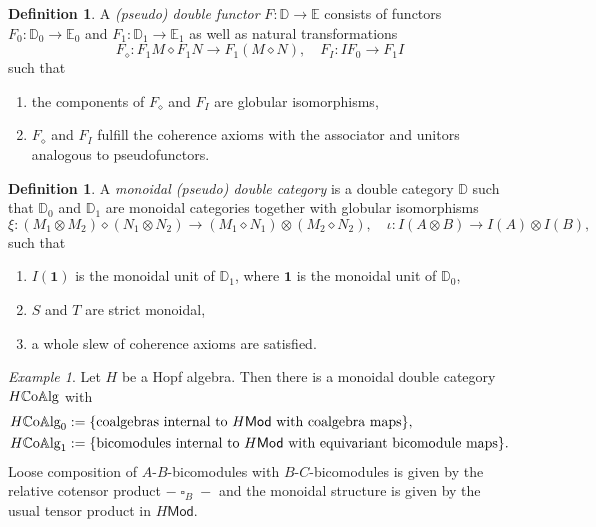 \documentclass[11pt]{report}
\theoremstyle{definition}
\newtheorem{definition}[theorem]{Definition}
\theoremstyle{remark}
\theoremstyle{remark}
\newtheorem*{example}{Example}
\begin{document}
\begin{definition}
A \emph{(pseudo) double functor} $F: \mathbb{D} \to \mathbb{E}$ consists of functors $F_0: \mathbb{D}_0 \to \mathbb{E}_0$ and $F_1: \mathbb{D}_1 \to \mathbb{E}_1$ as well as natural transformations
\begin{equation*}
F_\diamond: F_1 M \diamond F_1 N \to F_1(M \diamond N), \quad F_I: I F_0 \to F_1 I
\end{equation*}
such that
\begin{enumerate}[label=(\roman*)]
\item the components of $F_\diamond$ and $F_I$ are globular isomorphisms,
\item $F_\diamond$ and $F_I$ fulfill the coherence axioms with the associator and unitors analogous to pseudofunctors.
\end{enumerate}
\end{definition}

\begin{definition}
A \emph{monoidal (pseudo) double category} is a double category $\mathbb{D}$ such that $\mathbb{D}_0$ and $\mathbb{D}_1$ are monoidal categories together with globular isomorphisms
\begin{equation*}
\xi: (M_1 \otimes M_2) \diamond (N_1 \otimes N_2) \to (M_1 \diamond N_1) \otimes (M_2 \diamond N_2), \quad \iota: I(A \otimes B) \to I(A) \otimes I(B),
\end{equation*}
such that
\begin{enumerate}[label=(\roman*)]
\item $I(\mathbf{1})$ is the monoidal unit of $\mathbb{D}_1$, where $\mathbf{1}$ is the monoidal unit of $\mathbb{D}_0$,
\item $S$ and $T$ are strict monoidal,
\item a whole slew of coherence axioms are satisfied.
\end{enumerate}
\end{definition}

\begin{example}
Let $H$ be a Hopf algebra. Then there is a monoidal double category $H\mathbb{C}\textnormal{o}\mathbb{A}\textnormal{lg}$ with
\begin{align*}
H\mathbb{C}\textnormal{o}\mathbb{A}\textnormal{lg}_0 &:= \{ \text{coalgebras internal to } H\mathsf{Mod} \text{ with coalgebra maps} \}, \\
H\mathbb{C}\textnormal{o}\mathbb{A}\textnormal{lg}_1 &:= \{ \text{bicomodules internal to } H\mathsf{Mod} \text{ with equivariant bicomodule maps} \}.
\end{align*}
Loose composition of $A$-$B$-bicomodules with $B$-$C$-bicomodules is given by the relative cotensor product $- \operatorname{\square}_B -$ and the monoidal structure is given by the usual tensor product in $H\mathsf{Mod}$.
\end{example}
\end{document}
